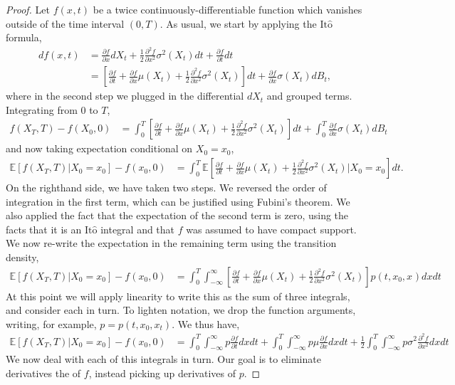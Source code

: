 \documentclass[12pt]{article}
\newcommand{\E}{\mathbb{E}}
\newcommand{\state}[1][t]{X_{#1}}
\newcommand{\stateValue}[1][t]{x_{#1}}
\newcommand{\BM}[1][t]{B_{#1}} %
\newcommand{\ito}{\text{It}\hat{\text{o}}}
\begin{document}
\begin{proof}
Let $f(\stateValue[], t)$ be a twice continuously-differentiable function which vanishes outside of the time interval $(0, T)$. As usual, we start by applying the 
$\ito$ formula,
\begin{align*}
df(\stateValue[], t) 
&= \frac{\partial f}{\partial x} d\state + \frac{1}{2} \frac{\partial^2 f}{\partial x^2} \sigma^2(\state) dt + \frac{\partial f}{\partial t} dt \\
&= \left[\frac{\partial f}{\partial t} + \frac{\partial f}{\partial x}\mu(\state) + \frac{1}{2}\frac{\partial^2 f}{\partial x^2}\sigma^2(\state) \right]dt + \frac{\partial f}{\partial x}\sigma(\state) d\BM,
\end{align*}
where in the second step we plugged in the differential $d\state$ and grouped terms. Integrating from $0$ to $T$, 
\begin{align*}
f(\state[T], T) - f(\state[0], 0) 
&= \int_{0}^{T} \left[\frac{\partial f}{\partial t} + \frac{\partial f}{\partial x}\mu(\state) + \frac{1}{2}\frac{\partial^2 f}{\partial x^2}\sigma^2(\state) \right]dt 
	+ \int_{0}^{T} \frac{\partial f}{\partial x}\sigma(\state) d\BM
\end{align*}
and now taking expectation conditional on $\state[0] = \stateValue[0]$,
\begin{align*}
\E[f(\state[T], T) | \state[0] = \stateValue[0]] - f(\stateValue[0], 0)
&= \int_{0}^{T} \E\left[\frac{\partial f}{\partial t} + \frac{\partial f}{\partial x}\mu(\state) + \frac{1}{2}\frac{\partial^2 f}{\partial x^2}\sigma^2(\state) \bigg| \state[0] = \stateValue[0] \right]dt.
\end{align*}
On the righthand side, we have taken two steps. We reversed the order of integration in the first term, which can be justified using Fubini's theorem.
We also applied the fact that the expectation of the second term is zero, using the facts that it is an $\ito$ integral and that $f$ was assumed to have compact support. 
We now re-write the expectation in the remaining term using the transition density, 
\begin{align*}
\E[f(\state[T], T) | \state[0] = \stateValue[0]] - f(\stateValue[0], 0)
&= \int_{0}^{T} \int_{-\infty}^{\infty} \left[\frac{\partial f}{\partial t} + \frac{\partial f}{\partial x}\mu(\state) + \frac{1}{2}\frac{\partial^2 f}{\partial x^2}\sigma^2(\state)\right] p(t,\stateValue[0],\stateValue[]) dx dt
\end{align*}
At this point we will apply linearity to write this as the sum of three integrals, and consider each in turn. To lighten notation, we drop the function arguments, writing, for example, 
$p = p(t, \stateValue[0], \stateValue)$. We thus have, 
\begin{align*}
\E[f(\state[T], T) | \state[0] = \stateValue[0]] - f(\stateValue[0], 0)
&= \int_{0}^{T} \int_{-\infty}^{\infty} p\frac{\partial f}{\partial t} dxdt + \int_{0}^{T} \int_{-\infty}^{\infty} p\mu \frac{\partial f}{\partial x} dxdt + \frac{1}{2} \int_{0}^{T} \int_{-\infty}^{\infty} p\sigma^2 \frac{\partial^2 f}{\partial x^2} dxdt
\end{align*}
We now deal with each of this integrals in turn. Our goal is to eliminate derivatives the of $f$, instead picking up derivatives of $p$. 


\end{proof}
\end{document}

